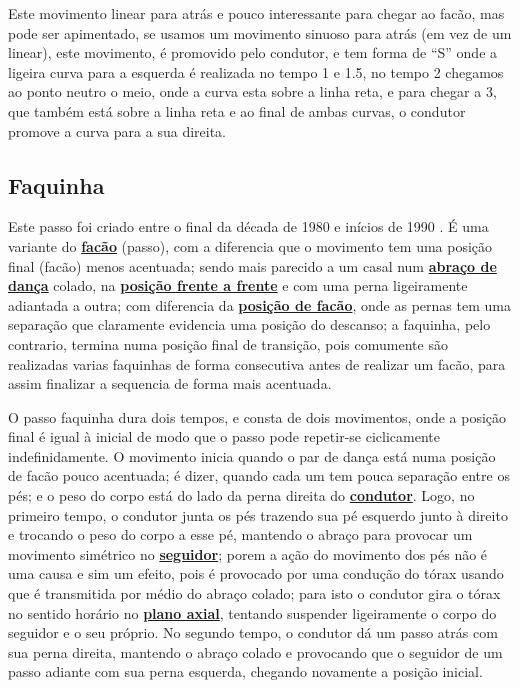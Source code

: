 Este movimento linear para atrás e pouco interessante para chegar ao facão, mas pode ser apimentado,
se usamos um movimento sinuoso para atrás (em vez de um linear), este movimento,
é promovido pelo condutor, e tem forma de ``S'' onde a ligeira curva para a esquerda é realizada no tempo 1 e 1.5,
no tempo  2 chegamos ao ponto neutro o meio, onde a curva esta sobre a linha reta, e para chegar a 3, 
que também está sobre a linha reta e ao final de ambas curvas,
o condutor promove a curva para a sua direita.

\subsection{Faquinha}
Este passo foi  criado entre o final da década de 1980 e inícios de 1990  \cite[pp. 143]{perna2002samba}.
É uma variante do  \hyperref[subsec:desc:passo:facao]{\textbf{facão}} (passo), 
com a diferencia que o movimento tem uma posição final (facão) menos acentuada;
sendo mais parecido a um casal num \hyperref[def:abracodedanca]{\textbf{abraço de dança}} colado, 
na \hyperref[def:frente-frente-position]{\textbf{posição frente a frente}}  e com uma perna ligeiramente adiantada a outra;
com diferencia da \hyperref[def:facao-position]{\textbf{posição de facão}}, 
onde as pernas tem uma separação que claramente evidencia uma posição do descanso;
a faquinha, pelo contrario, termina numa posição final de transição, 
pois comumente são realizadas varias faquinhas de forma consecutiva antes de realizar um facão,
 para assim finalizar a sequencia de forma mais acentuada.

O passo faquinha dura dois tempos, e consta de dois movimentos, 
onde a posição final é igual à inicial de modo que o passo pode repetir-se ciclicamente indefinidamente.
O movimento inicia quando o par de dança está numa posição de facão pouco acentuada;
é dizer, quando cada um tem pouca separação entre os pés; 
e o peso do corpo está do lado da perna direita do \hyperref[def:Condutor]{\textbf{condutor}}.
Logo, no primeiro tempo, 
o condutor junta os pés trazendo sua pé esquerdo junto à direito e trocando o peso do corpo a esse pé,
mantendo o abraço para provocar um movimento simétrico no \hyperref[def:Seguidor]{\textbf{seguidor}};
porem a ação do movimento dos pés não é uma causa e sim um efeito,
pois é provocado por uma condução do tórax usando que é transmitida por médio do abraço colado;
para isto o condutor gira o tórax no sentido horário no \hyperref[def:PlanoAxial]{\textbf{plano axial}},
tentando suspender ligeiramente o corpo do seguidor e o seu próprio.
No segundo tempo, o condutor dá um passo atrás com sua perna direita,
 mantendo o abraço colado e provocando que o seguidor de um passo adiante com sua perna esquerda,
chegando novamente a posição inicial.



